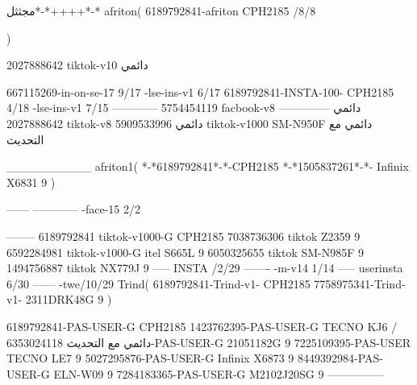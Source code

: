 مجثثل*-*++++*-*
afriton(
6189792841-afriton CPH2185  /8/8

)

2027888642 tiktok-v10
دائمي

667115269-in-on-se-17 9/17
-lse-ins-v1 6/17
6189792841-INSTA-100- CPH2185 4/18
-lse-ins-v1 7/15
------------
5754454119 facbook-v8
دائمي
--------------
2027888642 tiktok-v8
دائمي
5909533996 tiktok-v1000  SM-N950F
دائمي مع التحديث

__________
afriton1(
*-*6189792841*-*-CPH2185
*-*1505837261*-*-  Infinix X6831   9
)


------
------------
-face-15 2/2

--------
6189792841 tiktok-v1000-G CPH2185 
7038736306 tiktok   Z2359  9
6592284981 tiktok-v1000-G  itel S665L  9
6050325655 tiktok  SM-N985F  9
1494756887 tiktok  NX779J  9
-----
 INSTA /2/29
-------
-m-v14 1/14
-----
userinsta 6/30
------
-twe/10/29
Trind(
6189792841-Trind-v1- CPH2185 
7758975341-Trind-v1- 2311DRK48G  9
)


6189792841-PAS-USER-G CPH2185 
1423762395-PAS-USER-G TECNO KJ6  /دائمي مع التحديث
6353024118-PAS-USER-G   21051182G  9
7225109395-PAS-USER   TECNO LE7  9
5027295876-PAS-USER-G   Infinix X6873   9
8449392984-PAS-USER-G   ELN-W09   9
7284183365-PAS-USER-G   M2102J20SG   9
    ---------------
